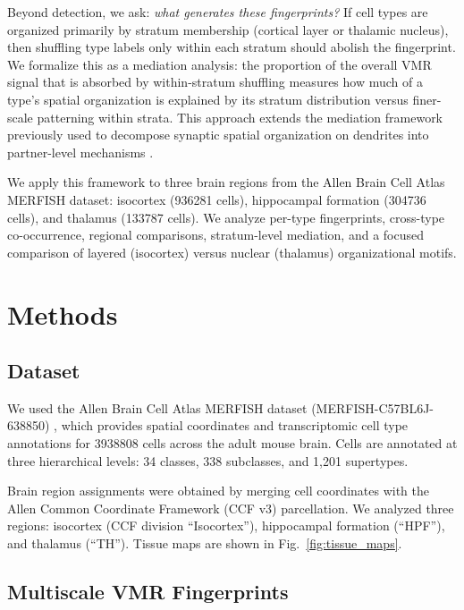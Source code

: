 \documentclass[11pt,a4paper]{article}
\begin{document}
Beyond detection, we ask: \emph{what generates these fingerprints?} If cell types
are organized primarily by stratum membership (cortical layer or thalamic nucleus),
then shuffling type labels only within each stratum should abolish the fingerprint.
We formalize this as a mediation analysis: the proportion of the overall VMR signal
that is absorbed by within-stratum shuffling measures how much of a type's spatial
organization is explained by its stratum distribution versus finer-scale patterning
within strata. This approach extends the mediation framework previously used to
decompose synaptic spatial organization on dendrites into partner-level mechanisms
\citep{voruganti2026population}.

We apply this framework to three brain regions from the Allen Brain Cell Atlas
MERFISH dataset: isocortex (\num{936281} cells), hippocampal formation
(\num{304736} cells), and thalamus (\num{133787} cells). We analyze per-type
fingerprints, cross-type co-occurrence, regional comparisons, stratum-level
mediation, and a focused comparison of layered (isocortex) versus nuclear
(thalamus) organizational motifs.


\section{Methods}
\label{sec:methods}

\subsection{Dataset}
\label{sec:dataset}

We used the Allen Brain Cell Atlas MERFISH dataset (MERFISH-C57BL6J-638850)
\citep{Zhang2023}, which provides spatial coordinates and transcriptomic cell
type annotations for \num{3938808} cells across the adult mouse brain. Cells
are annotated at three hierarchical levels: 34 classes, 338 subclasses, and
1,201 supertypes.

Brain region assignments were obtained by merging cell coordinates with the
Allen Common Coordinate Framework (CCF v3) parcellation. We analyzed three
regions: isocortex (CCF division ``Isocortex''), hippocampal formation (``HPF''),
and thalamus (``TH''). Tissue maps are shown in Fig.~\ref{fig:tissue_maps}.

\subsection{Multiscale VMR Fingerprints}
\label{sec:vmr}
\end{document}
